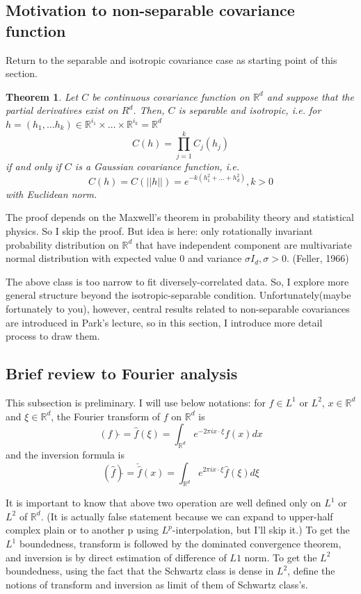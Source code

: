 \documentclass{article}
\newtheorem*{theorem}{Theorem}
\begin{document}
\subsection{Motivation to non-separable covariance function}
Return to the separable and isotropic covariance case as starting point of this section.
\begin{theorem}
    Let $C$ be continuous covariance function on $\mathbb R^d$ and suppose that the partial derivatives exist on $R^d$.
    Then, $C$ is separable and isotropic, i.e. for $h=(h_1,\dots h_k) \in \mathbb R^{i_1} \times \dots \times \mathbb R^{i_k}=\mathbb R^d$
    \[C(h)=\prod_{j=1}^{k}C_j(h_j)\]
    if and only if $C$ is a Gaussian covariance function, i.e.
    \[C(h)=C(||h||)=e^{-k(h_1^2+\dots+h_d^2)}, k>0\]
    with Euclidean norm.
\end{theorem}
The proof depends on the Maxwell's theorem in probability theory and statistical physics. So I skip the proof.
But idea is here: only rotationally invariant probability distribution on $\mathbb R^d$ that have independent component are multivariate normal distribution with expected value $0$ and variance $\sigma I_d, \sigma>0$.
(Feller, 1966)

The above class is too narrow to fit diversely-correlated data. So, I explore more general structure beyond the isotropic-separable condition.
Unfortunately(maybe fortunately to you), however, central results related to non-separable covariances are introduced in Park's lecture,
so in this section, I introduce more detail process to draw them.


\subsection{Brief review to Fourier analysis}
This subsection is preliminary.
I will use below notations: 
for $f\in L^1$ or $L^2$, $x\in\mathbb R^d$ and $\xi\in\mathbb R^d$, the Fourier transform of $f$ on $\mathbb R^d$ is
\[(f)\hat{ } = \hat{f}(\xi)=\int_{\mathbb R^d}e^{-2\pi i x\cdot \xi}f(x)dx\]
and the inversion formula is
\[(\hat{f})\check{ } = \check{\hat{f}}(x)= \int_{\mathbb R^d} e^{2\pi i x\cdot \xi} \hat{f}(\xi) d\xi\]

It is important to know that above two operation are well defined only on $L^1$ or $L^2$ of $\mathbb R^d$. 
(It is actually false statement because we can expand to upper-half complex plain or to another p using $L^p$-interpolation, but I'll skip it.)
To get the $L^1$ boundedness, transform is followed by the dominated convergence theorem,
and inversion is by direct estimation of difference of $L1$ norm.
To get the $L^2$ boundedness, using the fact that the Schwartz class is dense in $L^2$,
define the notions of transform and inversion as limit of them of Schwartz class's.
\end{document}
